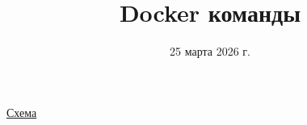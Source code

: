 \documentclass[aspectratio=169]{beamer}
\title{Docker команды}
\date{25 марта 2026 г.}
\begin{document}
    \maketitle

    \begin{frame}{}
        \centering
        \href{https://prafdin.github.io/devops-course/2026/extra/docker-commands.svg}{\Huge{Схема}}
    \end{frame}
\end{document}
